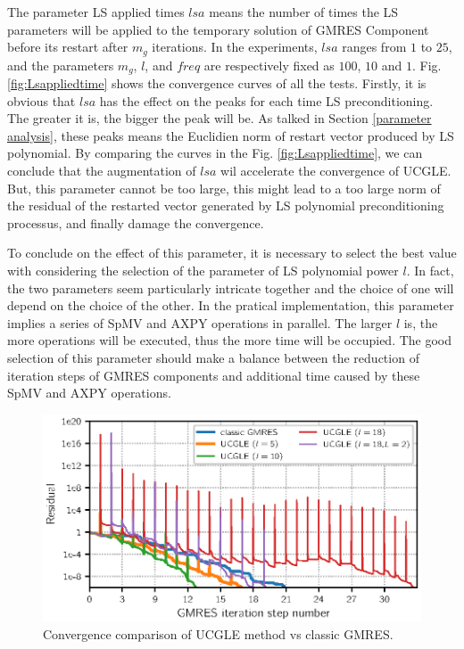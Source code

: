 The parameter LS applied times $lsa$ means the number of times the LS parameters will be applied to the temporary solution of GMRES Component before its restart after $m_g$ iterations. In the experiments, $lsa$ ranges from $1$ to $25$, and the parameters $m_g$, $l$, and $freq$ are respectively fixed as $100$, $10$ and $1$. Fig. \ref{fig:Lsappliedtime} shows the convergence curves of all the tests. Firstly, it is obvious that $lsa$ has the effect on the peaks for each time LS preconditioning. The greater it is, the bigger the peak will be. As talked in Section \ref{parameter analysis}, these peaks means the Euclidien norm of restart vector produced by LS polynomial. By comparing the curves in  the Fig. \ref{fig:Lsappliedtime}, we can conclude that the augmentation of $lsa$ wil accelerate the convergence of UCGLE. But, this parameter cannot be too large, this might lead to a too large norm of the residual of the restarted vector generated by LS polynomial preconditioning processus, and finally damage the convergence.

To conclude on the effect of this parameter, it is necessary to select the best value with considering the selection of the parameter of LS polynomial power $l$. In fact, the two parameters seem particularly intricate together and the choice of one will depend on the choice of the other. In the pratical implementation, this parameter implies a series of SpMV and AXPY operations in parallel. The larger $l$ is, the more operations will be executed, thus the more time will be occupied. The good selection of this parameter should make a balance between the reduction of iteration steps of GMRES components and additional time caused by these SpMV and AXPY operations.

\begin{figure}[htbp]
	\centering
	\includegraphics[width=6.2in]{fig/conv2.eps}
	\caption{Convergence comparison of UCGLE method vs classic GMRES.}
	\label{fig:lsdegree}
\end{figure}

